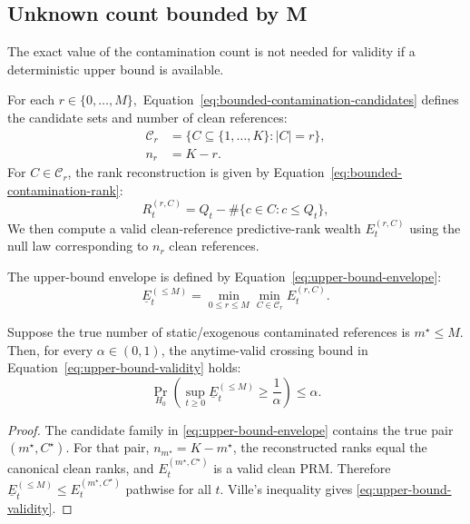 \subsection{Unknown count bounded by M}

The exact value of the contamination count is not needed for validity if a deterministic upper bound is available.

For each
\(r\in\{0,\ldots,M\},\)
Equation~\eqref{eq:bounded-contamination-candidates} defines the candidate sets and number of clean references:
\begin{equation}
\begin{aligned}
\mathcal C_r
&=\{C\subseteq\{1,\ldots,K\}:|C|=r\},\\
n_r&=K-r.
\end{aligned}
\label{eq:bounded-contamination-candidates}
\end{equation}
For \(C\in\mathcal C_r\), the rank reconstruction is given by Equation~\eqref{eq:bounded-contamination-rank}:
\begin{equation}
R_t^{(r,C)}
  =
  Q_t-\#\{c\in C:c\le Q_t\},
  \label{eq:bounded-contamination-rank}
\end{equation}
We then compute a valid clean-reference predictive-rank wealth \(E_t^{(r,C)}\) using the null law corresponding to \(n_r\) clean references.

The upper-bound envelope is defined by Equation~\eqref{eq:upper-bound-envelope}:
\begin{equation}
  \underline E_t^{(\le M)}
  =
  \min_{0\le r\le M}
  \min_{C\in\mathcal C_r}
  E_t^{(r,C)}.
  \label{eq:upper-bound-envelope}
\end{equation}

\begin{corollary}
Suppose the true number of static/exogenous contaminated references is \(m^\star\le M\). Then, for every \(\alpha\in(0,1)\), the anytime-valid crossing bound in Equation~\eqref{eq:upper-bound-validity} holds:
\begin{equation}
  \Pr_{H_0}\!\left(
    \sup_{t\ge0}
    \underline E_t^{(\le M)}
    \ge\frac1\alpha
  \right)
  \le\alpha.
  \label{eq:upper-bound-validity}
\end{equation}
\end{corollary}

\begin{proof}
The candidate family in \eqref{eq:upper-bound-envelope} contains the true pair \((m^\star,C^\star)\). For that pair, \(n_{m^\star}=K-m^\star\), the reconstructed ranks equal the canonical clean ranks, and \(E_t^{(m^\star,C^\star)}\) is a valid clean PRM. Therefore
\(\underline E_t^{(\le M)} \le E_t^{(m^\star,C^\star)}\)
pathwise for all \(t\). Ville's inequality gives \eqref{eq:upper-bound-validity}.
\end{proof}


